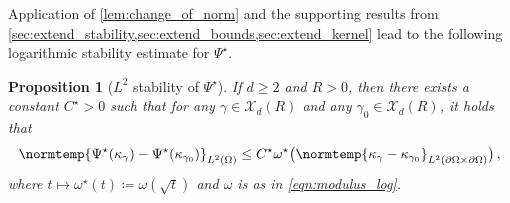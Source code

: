 \documentclass[pdflatex,sn-mathphys-num]{sn-jnl-preprint}
\newcommand{\cX}{\mathcal{X}}
\newcommand{\pOmega}{{\partial\Omega}}
\newcommand{\norm}{\normtemp}
\newcommand{\defeq}{\coloneqq} %
\theoremstyle{thmstyleone}%
\newtheorem{proposition}[theorem]{Proposition}%
\theoremstyle{thmstyletwo}%
\theoremstyle{thmstylethree}%
\numberwithin{equation}{section}
\numberwithin{theorem}{section}
\begin{document}
Application of \cref{lem:change_of_norm} and the supporting results from \cref{sec:extend_stability,sec:extend_bounds,sec:extend_kernel} lead to the following logarithmic stability estimate for $\Psi^\star$.
\begin{proposition}[$L^2$ stability of $\Psi^\star$]\label{prop:stability_kernel}
    If $d\geq 2$ and $R>0$, then there exists a constant $C^\star>0$ such that for any $\gamma\in\cX_d(R)$ and any $\gamma_0\in\cX_d(R)$, it holds that
    \begin{align}\label{eqn:stability_kernel_in}
        \norm{\Psi^\star(\kappa_\gamma)-\Psi^\star(\kappa_{\gamma_0})}_{L^2(\Omega)}\leq C^\star \omega^\star\bigl(\norm{\kappa_{\gamma}-\kappa_{\gamma_0}}_{L^2(\partial\Omega\times\pOmega)}\bigr)\,,
    \end{align}
    where $t\mapsto \omega^\star(t)\defeq \omega(\sqrt{t})$ and $\omega$ is as in \eqref{eqn:modulus_log}.
\end{proposition}
\end{document}
